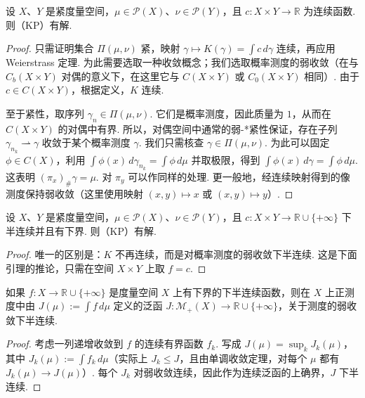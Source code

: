 \begin{theorem}\label{obj:1.4}
设 $X$、$Y$ 是紧度量空间，$\mu\in\mathscr P(X)$、$\nu\in\mathscr P(Y)$，且 $c:X\times Y\to\mathbb R$ 为连续函数. 则（KP）有解.
\end{theorem}
\begin{proof}
只需证明集合 $\Pi(\mu,\nu)$ 紧，映射 $\gamma\mapsto K(\gamma)=\int c\,d\gamma$ 连续，再应用 Weierstrass 定理. 为此需要选取一种收敛概念；我们选取概率测度的弱收敛（在与 $C_b(X\times Y)$ 对偶的意义下，在这里它与 $C(X\times Y)$ 或 $C_0(X\times Y)$ 相同）. 由于 $c\in C(X\times Y)$，根据定义，$K$ 连续.

至于紧性，取序列 $\gamma_n\in\Pi(\mu,\nu)$. 它们是概率测度，因此质量为 $1$，从而在 $C(X\times Y)$ 的对偶中有界. 所以，对偶空间中通常的弱-*紧性保证，存在子列 $\gamma_{n_k}\rightharpoonup\gamma$ 收敛于某个概率测度 $\gamma$. 我们只需核查 $\gamma\in\Pi(\mu,\nu)$. 为此可以固定 $\phi\in C(X)$，利用 $\int\phi(x)\,d\gamma_{n_k}=\int\phi\,d\mu$ 并取极限，得到 $\int\phi(x)\,d\gamma=\int\phi\,d\mu$. 这表明 $(\pi_x)_\#\gamma=\mu$. 对 $\pi_y$ 可以作同样的处理. 更一般地，经连续映射得到的像测度保持弱收敛（这里使用映射 $(x,y)\mapsto x$ 或 \mbox{$(x,y)\mapsto y$）.}
\end{proof}

\begin{theorem}\label{obj:1.5}
设 $X$、$Y$ 是紧度量空间，$\mu\in\mathscr P(X)$、$\nu\in\mathscr P(Y)$，且 $c:X\times Y\to\mathbb R\cup\{+\infty\}$ 下半连续并且有下界. 则（KP）有解.
\end{theorem}
\begin{proof}
唯一的区别是：$K$ 不再连续，而是对概率测度的弱收敛下半连续. 这是下面引理的推论，只需在空间 $X\times Y$ 上取 $f=c$.
\end{proof}

\begin{lemma}\label{obj:1.6}
如果 $f:X\to\mathbb R\cup\{+\infty\}$ 是度量空间 $X$ 上有下界的下半连续函数，则在 $X$ 上正测度中由 $J(\mu):=\int f\,d\mu$ 定义的泛函 $J:\mathscr M_+(X)\to\mathbb R\cup\{+\infty\}$，关于测度的弱收敛下半连续.
\end{lemma}
\begin{proof}
考虑一列递增收敛到 $f$ 的连续有界函数 $f_k$. 写成 $J(\mu)=\sup_k J_k(\mu)$，其中 $J_k(\mu):=\int f_k\,d\mu$（实际上 $J_k\le J$，且由单调收敛定理，对每个 $\mu$ 都有 $J_k(\mu)\to J(\mu)$）. 每个 $J_k$ 对弱收敛连续，因此作为连续泛函的上确界，$J$ 下半连续.
\end{proof}

